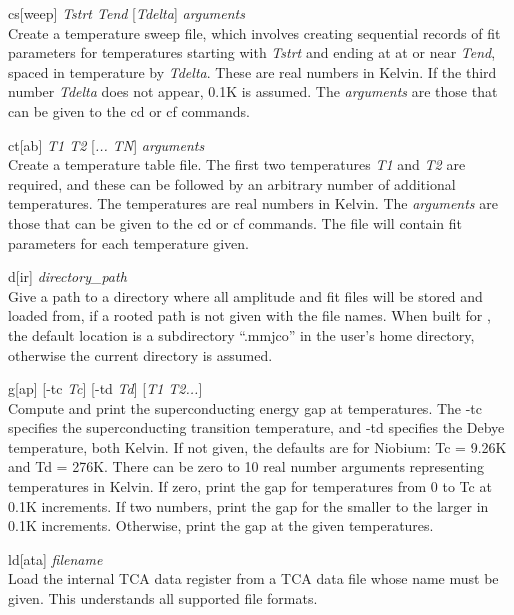{\begin{description}
\item{{\vt cs}[{\vt weep}] {\it Tstrt Tend} [{\it Tdelta\/}] {\it arguments}\\
Create a temperature sweep file, which involves creating sequential
records of fit parameters for temperatures starting with {\it Tstrt}
and ending at at or near {\it Tend}, spaced in temperature by {\it
Tdelta}.  These are real numbers in Kelvin.  If the third number {\it
Tdelta} does not appear, 0.1K is assumed.  The {\it arguments} are
those that can be given to the {\vt cd} or {\vt cf} commands.}

\item{{\vt ct}[{\vt ab}] {\it T1 T2} [{\it ... TN\/}] {\it arguments}\\
Create a temperature table file.  The first two temperatures {\it T1}
and {\it T2} are required, and these can be followed by an arbitrary
number of additional temperatures.  The temperatures are real numbers
in Kelvin.  The {\it arguments} are those that can be given to the
{\vt cd} or {\vt cf} commands.  The file will contain fit parameters
for each temperature given.}

\item{{\vt d}[{\vt ir}] {\it directory\_path}\\
Give a path to a directory where all amplitude and fit files will be
stored and loaded from, if a rooted path is not given with the file
names.  When built for {\XicTools}, the default location is a
subdirectory ``{\vt .mmjco}'' in the user's home directory, otherwise
the current directory is assumed.}

\item{{\vt g}[{\vt ap}] [{\vt -tc} {\it Tc\/}] [{\vt -td} {\it Td\/}]
  [{\it T1 T2...\/}]\\
Compute and print the superconducting energy gap at temperatures.  The
{\vt -tc} specifies the superconducting transition temperature, and
{\vt -td} specifies the Debye temperature, both Kelvin.  If not given,
the defaults are for Niobium:  Tc = 9.26K and Td = 276K.  There can be
zero to 10 real number arguments representing temperatures in Kelvin. 
If zero, print the gap for temperatures from 0 to Tc at 0.1K
increments.  If two numbers, print the gap for the smaller to the
larger in 0.1K increments.  Otherwise, print the gap at the given
temperatures.}

\item{{\vt ld}[{\vt ata}] {\it filename}\\
Load the internal TCA data register from a TCA data file whose name
must be given.  This understands all supported file formats.}


\end{description}}
